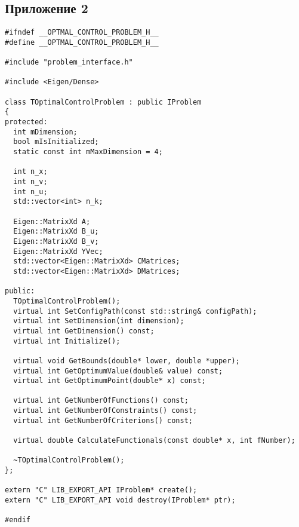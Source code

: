 \subsection{Приложение 2}
\label{attach2}
\begin{lstlisting}[frame=single]
#ifndef __OPTMAL_CONTROL_PROBLEM_H__
#define __OPTMAL_CONTROL_PROBLEM_H__

#include "problem_interface.h"

#include <Eigen/Dense>

class TOptimalControlProblem : public IProblem
{
protected:
  int mDimension;
  bool mIsInitialized;
  static const int mMaxDimension = 4;

  int n_x;
  int n_v;
  int n_u;
  std::vector<int> n_k;

  Eigen::MatrixXd A;
  Eigen::MatrixXd B_u;
  Eigen::MatrixXd B_v;
  Eigen::MatrixXd YVec;
  std::vector<Eigen::MatrixXd> CMatrices;
  std::vector<Eigen::MatrixXd> DMatrices;

public:
  TOptimalControlProblem();
  virtual int SetConfigPath(const std::string& configPath);
  virtual int SetDimension(int dimension);
  virtual int GetDimension() const;
  virtual int Initialize();

  virtual void GetBounds(double* lower, double *upper);
  virtual int GetOptimumValue(double& value) const;
  virtual int GetOptimumPoint(double* x) const;

  virtual int GetNumberOfFunctions() const;
  virtual int GetNumberOfConstraints() const;
  virtual int GetNumberOfCriterions() const;

  virtual double CalculateFunctionals(const double* x, int fNumber);

  ~TOptimalControlProblem();
};

extern "C" LIB_EXPORT_API IProblem* create();
extern "C" LIB_EXPORT_API void destroy(IProblem* ptr);

#endif
\end{lstlisting}
